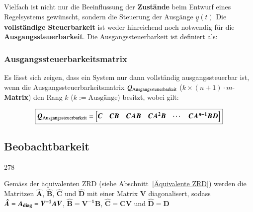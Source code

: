 Vielfach ist nicht nur die Beeinflussung der \textbf{Zustände} beim Entwurf eines Regelsystems gewünscht, sondern die 
Steuerung der Ausgänge $\underline{y}(t)$ Die \textbf{vollständige Steuerbarkeit} ist weder hinreichend noch notwendig
für die \textbf{Ausgangssteuerbarkeit}. Die Ausgangssteuerbarkeit ist definiert als: \\


\subsubsection{Ausgangssteuerbarkeitsmatrix}

Es lässt sich zeigen, dass ein System nur dann vollständig ausgangssteuerbar ist, wenn die Ausgangssteuerbarkeitsmatrix
$Q_{\rm Ausgangssteuerbarkeit}$ (\(k \times (n+1) \cdot m\)-\textbf{Matrix}) den Rang $k$ ($k := \text{Ausgänge}$) besitzt, wobei gilt:

$$ \boxed{\bm{Q}_{\rm Ausgangssteuerbarkeit} = 
\begin{bmatrix}
    \bm{C} & \bm{CB} & \bm{CAB} & \bm{CA^2B} & \cdots & \bm{C A^{n-1}BD}
\end{bmatrix} } $$

\subsection{Beobachtbarkeit}{278}

Gemäss der äquivalenten ZRD (siehe Abschnitt~\ref{Äquivalente ZRD}) werden die Matritzen $\bm{\hat{A}}$,
$\bm{\hat{B}}$, $\bm{\hat{C}}$ und $\bm{\hat{D}}$ mit einer Matrix $\bm{V}$ diagonalisert, sodass 
$\bm{\hat{A}} = \bm{A_{\rm diag}} = \bm{V^{-1} A V}$, $\bm{\hat{B}} = \bm{V^{-1} B}$, 
$\bm{\hat{C}} = \bm{C V}$ und $\bm{\hat{D}} = \bm{D}$

\vspace{0.2cm}

\vspace{0.2cm}

